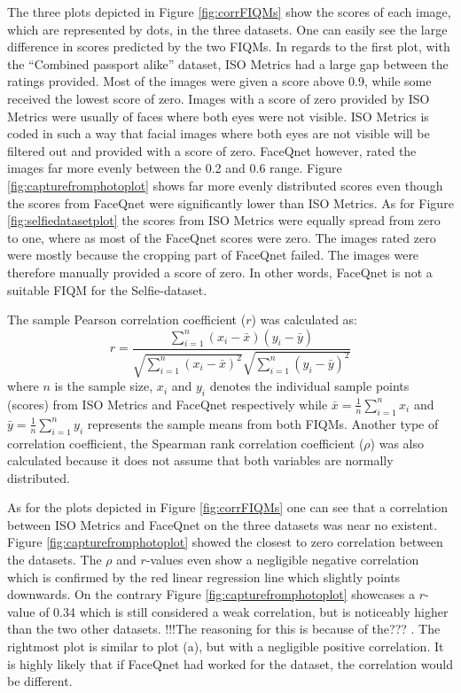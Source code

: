 The three plots depicted in Figure \ref{fig:corrFIQMs} show the scores of each image, which are represented by dots, in the three datasets. One can easily see the large difference in scores predicted by the two FIQMs. In regards to the first plot, with the ``Combined passport alike'' dataset, ISO Metrics had a large gap between the ratings provided. Most of the images were given a score above 0.9, while some received the lowest score of zero. Images with a score of zero provided by ISO Metrics were usually of faces where both eyes were not visible. ISO Metrics is coded in such a way that facial images where both eyes are not visible will be filtered out and provided with a score of zero. FaceQnet however, rated the images far more evenly between the 0.2 and 0.6 range. Figure \ref{fig:capturefromphotoplot} shows far more evenly distributed scores even though the scores from FaceQnet were significantly lower than ISO Metrics. As for Figure \ref{fig:selfiedatasetplot} the scores from ISO Metrics were equally spread from zero to one, where as most of the FaceQnet scores were zero. The images rated zero were mostly because the cropping part of FaceQnet failed. The images were therefore manually provided a score of zero. In other words, FaceQnet is not a suitable FIQM for the Selfie-dataset.  

The sample Pearson correlation coefficient ($r$) was calculated as: 
\begin{equation}
    {\displaystyle r={\frac {\sum _{i=1}^{n}(x_{i}-{\bar {x}})(y_{i}-{\bar {y}})}{{\sqrt {\sum _{i=1}^{n}(x_{i}-{\bar {x}})^{2}}}{\sqrt {\sum _{i=1}^{n}(y_{i}-{\bar {y}})^{2}}}}}}
\end{equation}
where $n$ is the sample size, $x_{i}$ and $y_{i}$ denotes the individual sample points (scores) from ISO Metrics and FaceQnet respectively while ${\bar {x}}={\frac {1}{n}}\sum _{i=1}^{n}x_{i}$ and ${\bar {y}}={\frac {1}{n}}\sum _{i=1}^{n}y_{i}$ represents the sample means from both FIQMs. Another type of correlation coefficient, the Spearman rank correlation coefficient ($\rho$) \cite{wiki:spearman} was also calculated because it does not assume that both variables are normally distributed.

As for the plots depicted in Figure \ref{fig:corrFIQMs} one can see that a correlation between ISO Metrics and FaceQnet on the three datasets was near no existent. Figure \ref{fig:capturefromphotoplot} showed the closest to zero correlation between the datasets. The $\rho$ and $r$-values even show a negligible negative correlation which is confirmed by the red linear regression line which slightly points downwards. On the contrary Figure \ref{fig:capturefromphotoplot} showcases a $r$-value of 0.34 which is still considered a weak correlation, but is noticeably higher than the two other datasets. !!!The reasoning for this is because of the??? . The rightmost plot is similar to plot (a), but with a negligible positive correlation. It is highly likely that if FaceQnet had worked for the dataset, the correlation would be different. 


